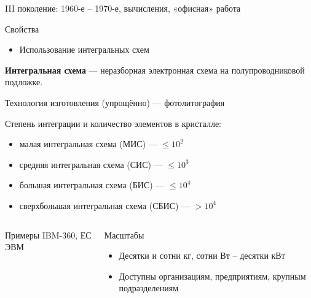 \documentclass[xetex,aspectratio=43]{beamer}
\begin{document}
\begin{frame}{III поколение: 1960-е -- 1970-е, вычисления, «офисная» работа}


	\begin{block}{Свойства}
		\begin{itemize}
			\item
			Использование интегральных схем
		\end{itemize}

		\textbf{Интегральная схема} --- неразборная электронная схема на
		полупроводниковой подложке.

		Технология изготовления (упрощённо) --- фотолитография

		Степень интеграции и количество элементов в кристалле:

		\begin{itemize}
			\tightlist
			\item
			малая интегральная схема (МИС) --- \(\le 10^2\)
			\item
			средняя интегральная схема (СИС) --- \(\le 10^3\)
			\item
			большая интегральная схема (БИС) --- \(\le 10^4\)
			\item
			сверхбольшая интегральная схема (СБИС) --- \(> 10^4\)
		\end{itemize}
	\end{block}

	\begin{columns}
		\begin{column}{0.25\textwidth}
			\begin{block}{Примеры}
				\vspace{5mm}
				IBM-360, ЕС ЭВМ
				\vspace{6mm}
			\end{block}
		\end{column}
		\begin{column}{0.75\textwidth}
			\begin{block}{Масштабы}
				\begin{itemize}
					\item
					Десятки и сотни кг, сотни Вт -- десятки кВт
					\item
					Доступны организациям, предприятиям, крупным подразделениям
				\end{itemize}
			\end{block}
		\end{column}
	\end{columns}

\end{frame}
\end{document}
